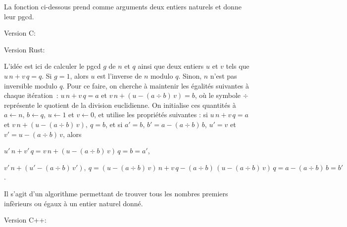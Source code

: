     \noindent 
    La fonction  ci-dessous prend comme arguments deux entiers naturels et donne leur pgcd.
    
    
    \blank[medium]
    
    \noindent Version C:

    \blank[samepage]

    
    \blank[medium]
    
    \noindent Version Rust: 
    
    \blank[samepage]

    
    \blank[medium]

    \noindent L'idée est ici de calculer le pgcd $g$ de $n$ et $q$ ainsi que deux entiers $u$ et $v$ tels que $u \, n + v \, q = q$. 
    Si $g = 1$, alors $u$ est l'inverse de $n$ modulo $q$. 
    Sinon, $n$ n'est pas inversible modulo $q$. 
    Pour ce faire, on cherche à maintenir les égalités suivantes à chaque itération : $u \, n + v \, q = a$ et $v \, n + (u - (a \div b) \, v) = b$, où le symbole $\div$ représente le quotient de la division euclidienne. 
    On initialise ces quantités à $a \leftarrow n$, $b \leftarrow q$, $u \leftarrow 1$ et $v \leftarrow 0$, et utilise les propriétés suivantes : si $u \, n + v \, q = a$ et $v \, n + (u - (a \div b) \, v) ,\ q = b$, et si $a' = b$, $b' = a - (a \div b) \, b$, $u' = v$ et $v' = u - (a \div b) \, v$, alors
    \startitemize[nowhite]
      \item $u' \, n + v' \, q = v \, n + (u - (a \div b) \, v) \, q = b = a'$,
      \item $v' \, n + (u' - (a \div b) \, v') ,\ q = (u - (a \div b) \, v) \, n + v \, q - (a \div b) \, (u - (a \div b) \, v) \, q = a - (a \div b) \, b = b'$.
    \stopitemize
  
  \stopsection

  \startsection[title=Crible d'Érastosthène, reference=app:code_erastosthene]
  
    
    Il s'agit d'un algorithme permettant de trouver tous les nombres premiers infèrieurs ou égaux à un entier naturel donné.
    
    \bigskip
    
    \noindent Version C++: 
    
    \blank[samepage]

